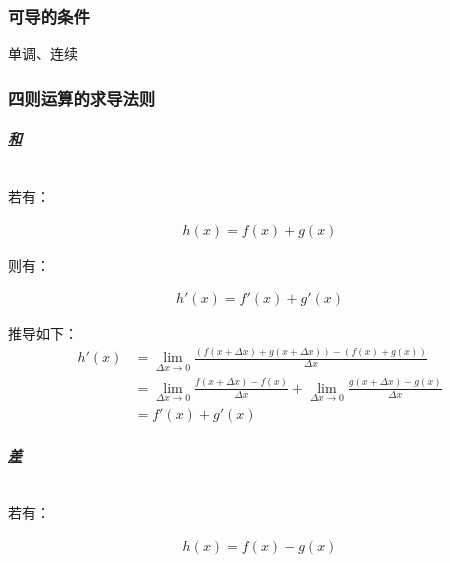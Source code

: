 \documentclass[12pt]{article}
\begin{document}
\subsubsection{可导的条件}

单调、连续

\subsubsection{四则运算的求导法则}

\paragraph{\textbf{\emph{\underline{和}}}}

\quad \\

若有：

\begin{equation*}
\begin{aligned}
h(x) = f(x) + g(x)
\end{aligned}
\end{equation*}

则有：

\begin{equation*}
\begin{aligned}
h'(x) = f'(x) + g'(x)
\end{aligned}
\end{equation*}

推导如下：\\

\begin{equation*}
\begin{aligned}
h'(x) & = \lim_{\Delta x \to 0}\frac{(f(x + \Delta x) + g(x + \Delta x)) - (f(x) + g(x))}{\Delta x}\\
& = \lim_{\Delta x \to 0}\frac{f(x + \Delta x) - f(x)}{\Delta x} + \lim_{\Delta x \to 0}\frac{g(x + \Delta x) - g(x)}{\Delta x}\\
& = f'(x) + g'(x)
\end{aligned}
\end{equation*}

\paragraph{\textbf{\emph{\underline{差}}}}

\quad \\

若有：

\begin{equation*}
\begin{aligned}
h(x) = f(x) - g(x)
\end{aligned}
\end{equation*}
\end{document}
